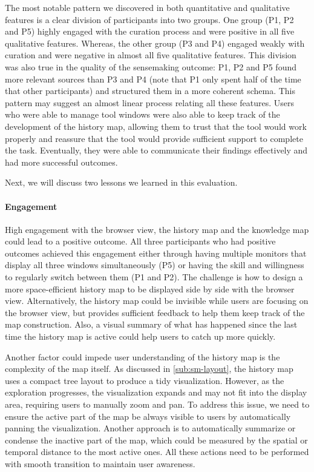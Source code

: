 The most notable pattern we discovered in both quantitative and qualitative features is a clear division of participants into two groups. One group (P1, P2 and P5) highly engaged with the  curation process and were positive in all five qualitative features. Whereas, the other group (P3 and P4) engaged weakly with curation and were negative in almost all five qualitative features. This division was also true in the quality of the sensemaking outcome: P1, P2 and P5 found more relevant sources than P3 and P4 (note that P1 only spent half of the time that other participants) and structured them in a more coherent schema. This pattern may suggest an almost linear process relating all these features. Users who were able to manage tool windows were also able to keep track of the development of the history map, allowing them to trust that the tool would work properly and reassure that the tool would provide sufficient support to complete the task. Eventually, they were able to communicate their findings effectively and had more successful outcomes.

Next, we will discuss two lessons we learned in this evaluation.

\paragraph{Engagement}
High engagement with the browser view, the history map and the knowledge map could lead to a positive outcome. All three participants who had positive outcomes achieved this engagement either through having multiple monitors that display all three windows simultaneously (P5) or having the skill and willingness to regularly switch between them (P1 and P2). The challenge is how to design a more space-efficient history map to be displayed side by side with the browser view.  Alternatively, the history map could be invisible while users are focusing on the browser view, but provides sufficient feedback to help them keep track of the map construction. Also, a visual summary of what has happened since the last time the history map is active could help users to catch up more quickly.

Another factor could impede user understanding of the history map is the complexity of the map itself.  As discussed in \autoref{sub:sm-layout}, the history map uses a compact tree layout to produce a tidy visualization. However, as the exploration progresses, the visualization expands and may not fit into the display area, requiring users to manually zoom and pan. To address this issue, we need to ensure the active part of the map be always visible to users by automatically panning the visualization. Another approach is to automatically summarize or condense the inactive part of the map, which could be measured by the spatial or temporal distance to the most active ones. All these actions need to be performed with smooth transition to maintain user awareness.

